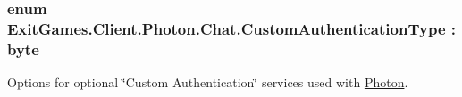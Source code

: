 \subsubsection[{\texorpdfstring{Custom\+Authentication\+Type}{CustomAuthenticationType}}]{\setlength{\rightskip}{0pt plus 5cm}enum {\bf Exit\+Games.\+Client.\+Photon.\+Chat.\+Custom\+Authentication\+Type} \+: byte\hspace{0.3cm}{\ttfamily [strong]}}\hypertarget{namespace_exit_games_1_1_client_1_1_photon_1_1_chat_aef14e10728bdf2b99b2a7e6fd4ac4a1c}{}\label{namespace_exit_games_1_1_client_1_1_photon_1_1_chat_aef14e10728bdf2b99b2a7e6fd4ac4a1c}


Options for optional \char`\"{}\+Custom Authentication\char`\"{} services used with \hyperlink{namespace_exit_games_1_1_client_1_1_photon}{Photon}. 

